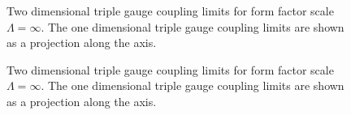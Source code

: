 \begin{figure}[htbp]
\begin{center}
{}
\caption{         Two dimensional triple gauge coupling limits for form factor scale $\Lambda=\infty$. The one dimensional triple gauge coupling limits are 
         shown as a projection along the axis.  
}
\label{fig:TGC-limits-2D-seven}
\end{center}
\end{figure}

\begin{figure}[htbp]
\begin{center}
\caption{         Two dimensional triple gauge coupling limits for form factor scale $\Lambda=\infty$. The one dimensional triple gauge coupling limits are 
         shown as a projection along the axis.  
}
\label{fig:TGC-limits-2D-eight}
\end{center}
\end{figure}

